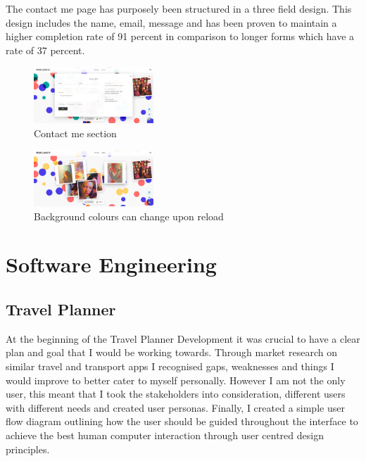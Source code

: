 \documentclass[]{project_final}
\begin{document}
The contact me page has purposely been structured in a three field design. This design includes the name, email, message and has been proven to maintain a higher completion rate of 91 percent in comparison to longer forms which have a rate of 37 percent.

\begin{figure}[ht!]
  \centering
  \includegraphics[width=0.4\textwidth]{AG35.png}
  \vspace*{0.0cm}
  \caption{Contact me section}
  \label{fig:1}
\end{figure}

\begin{figure}[ht!]
  \centering
  \includegraphics[width=0.4\textwidth]{AG36.png}
  \vspace*{0.0cm}
  \caption{Background colours can change upon reload}
  \label{fig:1}
\end{figure}

\chapter{Software Engineering}
\section{Travel Planner}
At the beginning of the Travel Planner Development it was crucial to have a clear plan and goal that I would be working towards. Through market research on similar travel and transport apps I recognised gaps, weaknesses and things I would improve to better cater to myself personally. However I am not the only user, this meant that I took the stakeholders into consideration, different users with different needs and created user personas.
Finally, I created a simple user flow diagram outlining how the user should be guided throughout the interface to achieve the best human computer interaction through user centred design principles.
\end{document}
